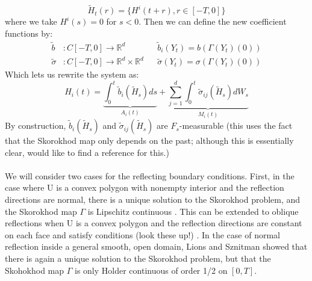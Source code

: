 \documentclass[]{article}
\theoremstyle{definition}
\theoremstyle{assumption}
\theoremstyle{remark}
\begin{document}
\begin{equation}
\tilde{H}_t(r) = \{H^i(t + r), r \in [-T, 0] \}
\end{equation}
where we take $H^i(s) = 0$ for $s < 0$. Then we can define the new coefficient functions by:
\begin{align*}
\tilde{b}&: C[-T, 0] \rightarrow \mathbb{R}^d && \tilde{b}_i(Y_t) = b( \Gamma(Y_t)(0)) \\
\tilde{\sigma}&: C[-T, 0] \rightarrow \mathbb{R}^d \times \mathbb{R}^d && \tilde{\sigma}(Y_t) = \sigma(\Gamma(Y_t)(0))
\end{align*}
Which lets us rewrite the system as:
\begin{equation} \label{eq:fSDE}
H_i(t) =  \underbrace{ \int_0^t \tilde{b}_i(\tilde{H}_s) ds}_{A_i(t)}+ \underbrace{\sum_{j=1}^d \int_0^t  \tilde{\sigma}_{ij}(\tilde{H}_s)dW_s }_{M_i(t)}
\end{equation}
By construction, $\tilde{b}_i(\tilde{H}_s)$ and $\tilde{\sigma}_{ij}(\tilde{H}_s)$ are $F_s$-measurable (this uses the fact that the Skorokhod map only depends on the past; although this is essentially clear, would like to find a reference for this.) \\ \\

We will consider two cases for the reflecting boundary conditions. First, in the case where U is a convex polygon with nonempty interior and the reflection directions are normal, there is a unique solution to the Skorokhod problem, and the Skorokhod map $\Gamma$ is Lipschitz continuous \cite{Dupuis91}. This can be extended to oblique reflections when U is a convex polygon and the reflection directions are constant on each face and satisfy conditions (look these up!) \cite{Dupuis91}. In the case of normal reflection inside a general smooth, open domain, Lions and Sznitman \cite[Theorem 1.1]{Lions84} showed that there is again a unique solution to the Skorokhod problem, but that the Skohokhod map $\Gamma$ is only Holder continuous of order 1/2 on $[0, T]$.
\end{document}
